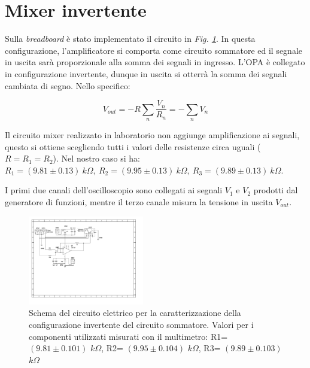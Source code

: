 \documentclass[journal]{IEEEtran}
\begin{document}

\section{\textbf{Mixer invertente}} %
Sulla \textit{breadboard} è stato implementato il circuito in \textit{Fig. \ref{fig:OPA-mixer}}. In questa configurazione, l'amplificatore si comporta come circuito sommatore ed il segnale in uscita sarà proporzionale alla somma dei segnali in ingresso. L'OPA è collegato in configurazione invertente, dunque in uscita si otterrà la somma dei segnali cambiata di segno. Nello specifico: 

\begin{equation}
V_{out} = - R  \sum_{n} \frac{V_n}{R_n} = - \sum_{n} V_n 
\end{equation}

Il circuito mixer realizzato in laboratorio non aggiunge amplificazione ai segnali, questo si ottiene scegliendo tutti i valori delle resistenze circa uguali ($R = R_1 = R_2$). Nel nostro caso si ha: $R_1 =(9.81 \pm 0.13) \ k\Omega, \ R_2 = (9.95 \pm 0.13) \ k\Omega ,\ R_3 = (9.89 \pm 0.13) \ k\Omega$.

I primi due canali dell'oscilloscopio sono collegati ai segnali $V_1$ e $V_2$ prodotti dal generatore di funzioni, mentre il terzo canale misura la tensione in uscita $V_{out}$.


\begin{figure}[H]%
\begin{center}
\includegraphics[width=0.45\textwidth]{sch-simulations/output/OPA-mixer.pdf}
\caption{Schema  del  circuito  elettrico  per  la  caratterizzazione  della configurazione invertente del circuito sommatore. Valori per i componenti utilizzati misurati con il multimetro: R1= $(9.81 \pm 0.101)$ $k\Omega$, R2= $(9.95 \pm 0.104)$ $k\Omega$, R3= $(9.89 \pm 0.103)$ $k\Omega$}
\label{fig:OPA-mixer}
\end {center}
\end{figure}
\end{document}
